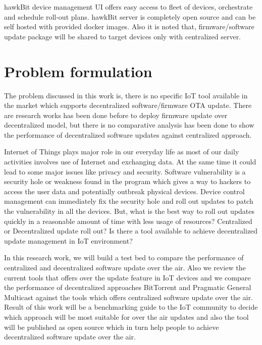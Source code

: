 \documentclass[12pt]{article}
\begin{document}
hawkBit device management UI offers easy access to fleet of devices, orchestrate and schedule roll-out plans. hawkBit server is completely open source and can be self hosted with provided docker images. Also it is noted that, firmware/software update package will be shared to target devices only with centralized server.

\section{Problem formulation}

The problem discussed in this work is, there is no specific IoT tool available in the market which supports decentralized software/firmware OTA update. There are research works has been done before to deploy firmware update over decentralized model, but there is no comparative analysis has been done to show the performance of decentralized software updates against centralized approach.

Internet of Things plays major role in our everyday life as most of our daily activities involves use of Internet and exchanging data. At the same time it could lead to some major issues like privacy and security. Software vulnerability is a security hole or weakness found in the program which gives a way to hackers to access the user data and potentially outbreak physical devices. Device control management can immediately fix the security hole and roll out updates to patch the vulnerability in all the devices. But, what is the best way to roll out updates quickly in a reasonable amount of time with less usage of resources? Centralized or Decentralized update roll out?  Is there a tool available to achieve decentralized update management in IoT environment? 

In this research work, we will build a test bed to compare the performance of centralized and decentralized software update over the air. Also we review the current tools that offers over the update feature in IoT devices and we compare the performance of decentralized approaches BitTorrent and Pragmatic General Multicast against the tools which offers centralized software update over the air. Result of this work will be a benchmarking guide to the IoT community to decide which approach will be most suitable for over the air updates and also the tool will be published as open source which in turn help people to achieve decentralized software update over the air.
\\
\end{document}

